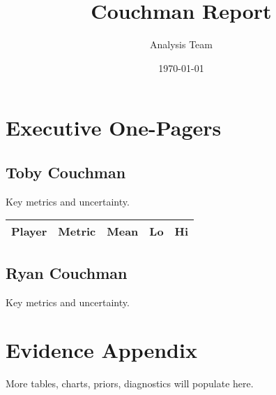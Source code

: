 \documentclass[11pt]{article}
\title{Couchman Report}
\author{Analysis Team}
\date{\today}
\begin{document}
\maketitle

\section*{Executive One-Pagers}
\subsection*{Toby Couchman}
Key metrics and uncertainty.
\begin{table}[h!]
\centering
\begin{tabular}{l l r r r}
\toprule
Player & Metric & Mean & Lo & Hi \\
\midrule

\bottomrule
\end{tabular}
\end{table}

\subsection*{Ryan Couchman}
Key metrics and uncertainty.

\section{Evidence Appendix}
More tables, charts, priors, diagnostics will populate here.
\end{document}
